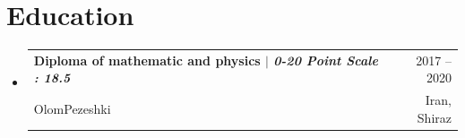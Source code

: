 \documentclass[A4,11pt]{article}
\makeatletter
\newcommand{\CVSubheading}[4]{
  \vspace{-2pt}\item
    \begin{tabular*}{0.97\textwidth}[t]{l@{\extracolsep{\fill}}r}
      \textbf{#1} & #2 \\
      \small#3 & \small #4 \\
    \end{tabular*}\vspace{-7pt}
}
\newcommand{\CVSubHeadingListStart}{\begin{itemize}[leftmargin=0.5cm, label={}]}
\newcommand{\CVSubHeadingListEnd}{\end{itemize}}
\makeatother
\begin{document}

\section{Education}
  \CVSubHeadingListStart
    \CVSubheading
      {{Diploma of mathematic and physics $|$ \emph{\small{0-20 Point Scale : 18.5}}}}{2017 -- 2020}
      {OlomPezeshki}{Iran, Shiraz}
  \CVSubHeadingListEnd
\end{document}
